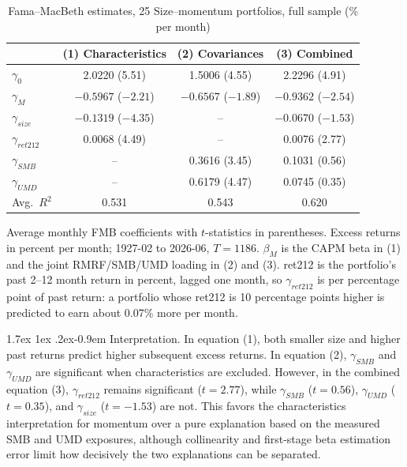 \documentclass[11pt]{article}
\makeatletter
\renewcommand\paragraph{\@startsection{paragraph}{4}{0pt}%
  {1.7ex \@plus 1ex \@minus .2ex}{-0.9em}%
  {\normalfont\bfseries\normalsize\color{psink}}}
\makeatother
\begin{document}
\begin{table}[H]\centering\small
\caption{Fama--MacBeth estimates, 25 Size--momentum portfolios, full sample (\% per month)}\label{tab:momfull}
\begin{tabular}{lccc}
\toprule
 & (1) Characteristics & (2) Covariances & (3) Combined \\
\midrule
$\gamma_0$        & 2.0220 (5.51)       & 1.5006 (4.55)       & 2.2296 (4.91)       \\
$\gamma_M$        & $-0.5967$ ($-2.21$) & $-0.6567$ ($-1.89$) & $-0.9362$ ($-2.54$) \\
$\gamma_{size}$   & $-0.1319$ ($-4.35$) & --                  & $-0.0670$ ($-1.53$) \\
$\gamma_{ret212}$ & 0.0068 (4.49)       & --                  & 0.0076 (2.77)       \\
$\gamma_{SMB}$    & --                  & 0.3616 (3.45)       & 0.1031 (0.56)       \\
$\gamma_{UMD}$    & --                  & 0.6179 (4.47)       & 0.0745 (0.35)       \\
\midrule
Avg.\ $R^2$       & 0.531               & 0.543               & 0.620               \\
\bottomrule
\end{tabular}
\par\smallskip\footnotesize Average monthly FMB coefficients with $t$-statistics in
parentheses. Excess returns in percent per month; 1927-02 to 2026-06, $T = 1186$.
$\beta_M$ is the CAPM beta in (1) and the joint RMRF/SMB/UMD loading in (2) and (3).
ret212 is the portfolio's past 2--12 month return in percent, lagged one month, so
$\gamma_{ret212}$ is per percentage point of past return: a portfolio whose ret212 is
10 percentage points higher is predicted to earn about 0.07\% more per month.
\end{table}

\paragraph{Interpretation.} In equation (1), both smaller size and higher past returns
predict higher subsequent excess returns. In equation (2), $\gamma_{SMB}$ and
$\gamma_{UMD}$ are significant when characteristics are excluded. However, in the
combined equation (3), $\gamma_{ret212}$ remains significant ($t = 2.77$), while
$\gamma_{SMB}$ ($t = 0.56$), $\gamma_{UMD}$ ($t = 0.35$), and $\gamma_{size}$
($t = -1.53$) are not. This favors the characteristics interpretation for momentum over a
pure explanation based on the measured SMB and UMD exposures, although collinearity and
first-stage beta estimation error limit how decisively the two explanations can be
separated.
\end{document}
